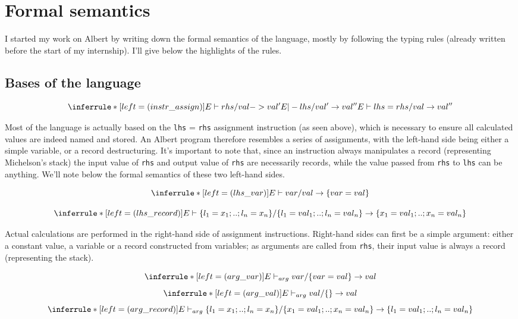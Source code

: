 \documentclass{report}
\begin{document}
\section{Formal semantics}
\label{albertSemantics}

I started my work on Albert by writing down the formal semantics of the language, mostly by following the typing rules (already written before the start of my internship). I'll give below the highlights of the rules.

\subsection{Bases of the language}

$$
\inferrule* [left=(instr\_assign)]
    { E \vdash rhs / val -> val' \\ E |- lhs / val' \rightarrow val'' }
    { E \vdash lhs = rhs / val \rightarrow val'' }
$$

Most of the language is actually based on the \texttt{lhs} = \texttt{rhs} assignment instruction (as seen above), which is necessary to ensure all calculated values are indeed named and stored. An Albert program therefore resembles a series of assignments, with the left-hand side being either a simple variable, or a record destructuring. It's important to note that, since an instruction always manipulates a record (representing Michelson's stack) the input value of \lstinline{rhs} and output value of \lstinline{rhs} are necessarily records, while the value passed from \lstinline{rhs} to \lstinline{lhs} can be anything. We'll note below the formal semantics of these two left-hand sides.

$$
\inferrule* [left=(lhs\_var)]
    { }
    { E \vdash var / val \rightarrow \{ var = val \} }
$$

$$
\inferrule* [left=(lhs\_record)]
    { }
    { E \vdash \{ l_1 = x_1 ; .. ; l_n = x_n \} / \{ l_1 = val_1 ; .. ; l_n = val_n \} \rightarrow \{ x_1 = val_1 ; .. ; x_n = val_n \} }
$$

    Actual calculations are performed in the right-hand side of assignment instructions. Right-hand sides can first be a simple argument: either a constant value, a variable or a record constructed from variables; as arguments are called from \lstinline{rhs}, their input value is always a record (representing the stack).

$$
\inferrule* [left=(arg\_var)]
    { }
    { E \vdash_{arg} var / \{ var = val \} \rightarrow val }
$$
$$
\inferrule* [left=(arg\_val)]
    { }
    { E \vdash_{arg} val / \{\} \rightarrow val }
$$
$$
\inferrule* [left=(arg\_record)]
    { }
    { E \vdash_{arg} \{ l_1 = x_1 ; .. ; l_n = x_n \} / \{ x_1 = val_1 ; .. ; x_n = val_n \} \rightarrow \{ l_1 = val_1 ; .. ; l_n = val_n \} }
$$
\end{document}
